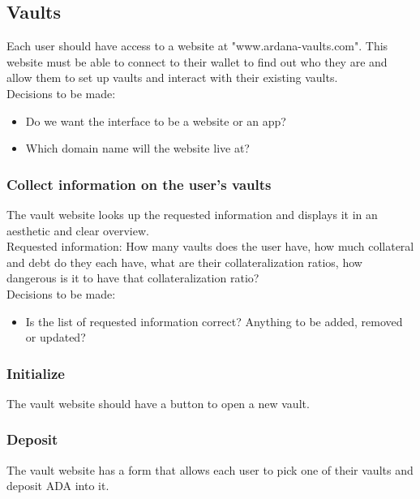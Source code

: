 \documentclass{article} %
\begin{document}
\subsection{Vaults}

Each user should have access to a website at "www.ardana-vaults.com". This
website must be able to connect to their wallet to find out who they are and
allow them to set up vaults and interact with their existing vaults. \\

Decisions to be made:
\begin{itemize}
  \item Do we want the interface to be a website or an app?
  \item Which domain name will the website live at?
\end{itemize}

\subsubsection{Collect information on the user's vaults}

The vault website looks up the requested information and displays it in an
aesthetic and clear overview. \\

Requested information: How many vaults does the user have, how much collateral
and debt do they each have, what are their collateralization ratios, how
dangerous is it to have that collateralization ratio? \\

Decisions to be made:
\begin{itemize}
  \item Is the list of requested information correct? Anything to be added,
    removed or updated?
\end{itemize}

\subsubsection{Initialize}

The vault website should have a button to open a new vault.

\subsubsection{Deposit}

The vault website has a form that allows each user to pick one of their vaults
and deposit ADA into it. \\
\end{document}
